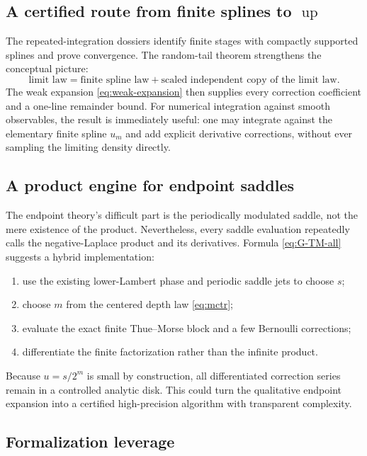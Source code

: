 \documentclass[11pt,oneside]{article}
\numberwithin{equation}{section}
\theoremstyle{definition}
\theoremstyle{remark}
\newcommand{\Up}{\operatorname{up}}
\begin{document}
\subsection{A certified route from finite splines to $\Up$}

The repeated-integration dossiers identify finite stages with compactly supported splines and
prove convergence.  The random-tail theorem strengthens the conceptual picture:
\[
 \text{limit law} = \text{finite spline law} + \text{scaled independent copy of the limit law}.
\]
The weak expansion \eqref{eq:weak-expansion} then supplies every correction coefficient and a
one-line remainder bound.  For numerical integration against smooth observables, the result
is immediately useful: one may integrate against the elementary finite spline $u_m$ and add
explicit derivative corrections, without ever sampling the limiting density directly.

\subsection{A product engine for endpoint saddles}

The endpoint theory's difficult part is the periodically modulated saddle, not the mere
existence of the product.  Nevertheless, every saddle evaluation repeatedly calls the
negative-Laplace product and its derivatives.  Formula \eqref{eq:G-TM-all} suggests a hybrid
implementation:
\begin{enumerate}
\item use the existing lower-Lambert phase and periodic saddle jets to choose $s$;
\item choose $m$ from the centered depth law \eqref{eq:mctr};
\item evaluate the exact finite Thue--Morse block and a few Bernoulli corrections;
\item differentiate the finite factorization rather than the infinite product.
\end{enumerate}
Because $u=s/2^m$ is small by construction, all differentiated correction series remain in a
controlled analytic disk.  This could turn the qualitative endpoint expansion into a
certified high-precision algorithm with transparent complexity.

\subsection{Formalization leverage}
\end{document}

